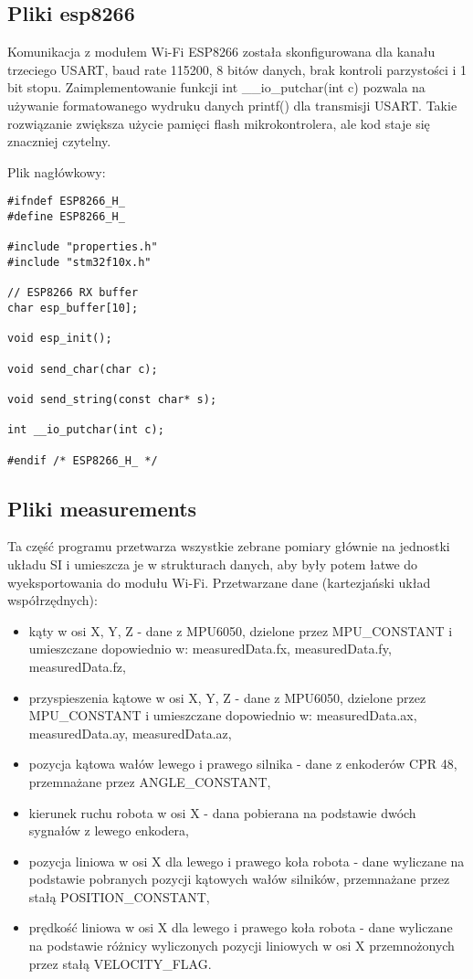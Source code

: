 \documentclass[a4paper,12pt,twoside,openany]{report}
\begin{document}
\subsection{Pliki esp8266}

Komunikacja z modułem Wi-Fi ESP8266 została skonfigurowana dla kanału trzeciego USART, baud rate 115200, 8 bitów danych, brak kontroli parzystości i 1 bit stopu. Zaimplementowanie funkcji int \_\_io\_putchar(int c) pozwala na używanie formatowanego wydruku danych printf() dla transmisji USART. Takie rozwiązanie zwiększa użycie pamięci flash mikrokontrolera, ale kod staje się znaczniej czytelny. 

\newpage
\noindent Plik nagłówkowy:\\
\begin{lstlisting}[style=customc]
#ifndef ESP8266_H_
#define ESP8266_H_

#include "properties.h"
#include "stm32f10x.h"

// ESP8266 RX buffer
char esp_buffer[10];

void esp_init();

void send_char(char c);

void send_string(const char* s);

int __io_putchar(int c);

#endif /* ESP8266_H_ */

\end{lstlisting}

\subsection{Pliki measurements}

Ta część programu przetwarza wszystkie zebrane pomiary głównie na jednostki układu SI i umieszcza je w strukturach danych, aby były potem łatwe do wyeksportowania do modułu Wi-Fi. Przetwarzane dane (kartezjański układ współrzędnych):
\begin{itemize}
\item kąty w osi X, Y, Z - dane z MPU6050, dzielone przez MPU\_CONSTANT i umieszczane dopowiednio w: measuredData.fx, measuredData.fy, measuredData.fz,
\item przyspieszenia kątowe w osi X, Y, Z - dane z MPU6050, dzielone przez MPU\_CONSTANT i umieszczane dopowiednio w: measuredData.ax, measuredData.ay, measuredData.az,
\item pozycja kątowa wałów lewego i prawego silnika - dane z enkoderów CPR 48, przemnażane przez ANGLE\_CONSTANT,
\item kierunek ruchu robota w osi X - dana pobierana na podstawie dwóch sygnałów z lewego enkodera,
\item pozycja liniowa w osi X dla lewego i prawego koła robota - dane wyliczane na podstawie pobranych pozycji kątowych wałów silników, przemnażane przez stałą POSITION\_CONSTANT,
\item prędkość liniowa w osi X dla lewego i prawego koła robota - dane wyliczane na podstawie różnicy wyliczonych pozycji liniowych w osi X przemnożonych przez stałą VELOCITY\_FLAG.
\end{itemize}
\end{document}
